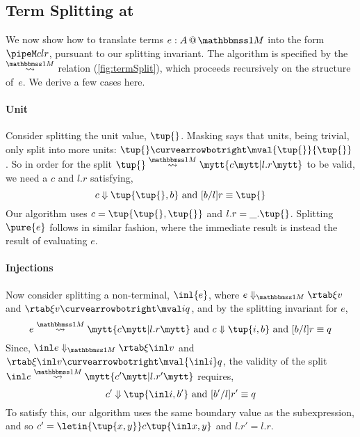 \begin{abstrsyn}



\subsection{Term Splitting at \bbonem}
\label{sec:split-one}

We now show how to translate terms $\colmix e A$ into the form $\pipeM c l r$,
pursuant to our splitting invariant.
The algorithm is specified by the $\splitonesym$ relation (\cref{fig:termSplit}), 
which proceeds recursively on the structure of~$e$. We derive a few cases here.

\paragraph {Unit} 
Consider splitting the unit value, $\tup{}$.
Masking says that units, being trivial, only split into more units: $\tup{} \vsplito \mval {\tup{}} {\tup{}}$.
So in order for the split $\splitone {\tup {}} A c {l.r}$ to be valid, 
we need a $c$ and $l.r$ satisfying,
\[
	\reduce c {\tup{\tup{},b}} \text{ and } [b/l]r \equiv \tup{}
\]
Our algorithm uses $c=\tup{\tup{},\tup{}}$ and $l.r = \_.\tup{}$.
Splitting $\pure{e}$ follows in similar fashion, 
where the immediate result is instead the result of evaluating $e$.

\paragraph {Injections} 
Now consider splitting a non-terminal, $\inl {e}$,
where $\diaone {e} \xi v$ and $\rtab \xi v \vsplito \mval i q$, 
and by the splitting invariant for $e$,
\[
	\splitone e A c {l.r} \text{ and } \reduce c {\tup{i,b}} \text{ and } [b/l]r \equiv q
\]
Since, $\diaone {\inl e} \xi {\inl v}$ and $\rtab \xi {\inl v} \vsplito \mval {\inl i} q$,
the validity of the split $\splitone {\inl e} A {c'} {l.r'}$ requires,
\[
	\reduce {c'} {\tup{\inl i,b'}} \text{ and } [b'/l]r' \equiv q
\]
To satisfy this, our algorithm uses the same boundary value as the subexpression,
and so $c' = \letin {\tup {x,y}} c {\tup{\inl x, y}}$ and $l.r' = l.r$.


\end{abstrsyn}
